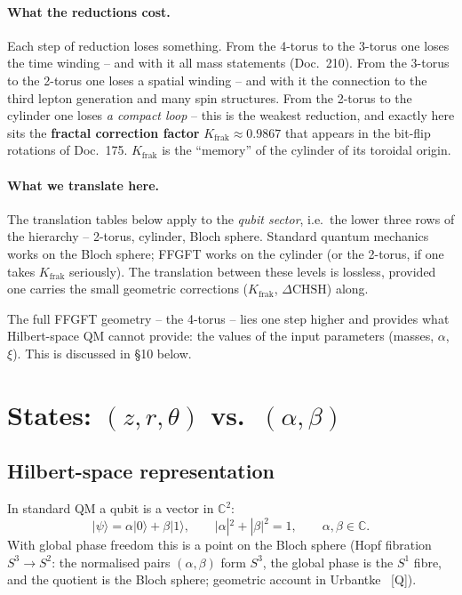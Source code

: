 \paragraph{What the reductions cost.}
Each step of reduction loses something. From the 4-torus to the
3-torus one loses the time winding -- and with it all mass
statements (Doc.~210). From the 3-torus to the 2-torus one loses a
spatial winding -- and with it the connection to the third lepton
generation and many spin structures. From the 2-torus to the
cylinder one loses \emph{a compact loop} -- this is the weakest
reduction, and exactly here sits the \textbf{fractal correction
factor} $K_{\text{frak}} \approx 0.9867$ that appears in the
bit-flip rotations of Doc.~175. $K_{\text{frak}}$ is the
\enquote{memory} of the cylinder of its toroidal origin.

\paragraph{What we translate here.}
The translation tables below apply to the \emph{qubit sector},
i.e.\ the lower three rows of the hierarchy -- 2-torus, cylinder,
Bloch sphere. Standard quantum mechanics works on the Bloch
sphere; FFGFT works on the cylinder (or the 2-torus, if one takes
$K_{\text{frak}}$ seriously). The translation between these levels
is lossless, provided one carries the small geometric corrections
($K_{\text{frak}}$, $\Delta\text{CHSH}$) along.

The full FFGFT geometry -- the 4-torus -- lies one step higher and
provides what Hilbert-space QM cannot provide: the values of the
input parameters (masses, $\alpha$, $\xi$). This is discussed in
§10 below.

\section{\texorpdfstring{States: $(z, r, \theta)$ vs.\ $(\alpha, \beta)$}{States: (z,r,theta) vs. (alpha,beta)}}

\subsection{Hilbert-space representation}

In standard QM a qubit is a vector in $\mathbb{C}^2$:
\begin{equation}
  |\psi\rangle = \alpha|0\rangle + \beta|1\rangle,
  \qquad
  |\alpha|^2 + |\beta|^2 = 1,
  \qquad
  \alpha, \beta \in \mathbb{C}.
\end{equation}
With global phase freedom this is a point on the Bloch sphere
(Hopf fibration $S^3 \to S^2$: the normalised pairs $(\alpha,\beta)$
form $S^3$, the global phase is the $S^1$ fibre, and the quotient is
the Bloch sphere; geometric account in Urbantke~\cite{urbantke2003}
[Q]).

